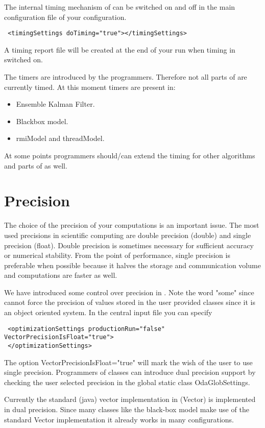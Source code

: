 The internal timing mechanism of \oda can be switched on and off in the main configuration file of your \oda configuration. 
{\footnotesize
\begin{verbatim}
 <timingSettings doTiming="true"></timingSettings>
\end{verbatim}}  
A timing report file will be created at the end of your run when timing in switched on.

The timers are introduced by the programmers. Therefore not all parts of \oda are currently timed. At this moment timers are present in:
\begin{itemize}
\item Ensemble Kalman Filter.
\item Blackbox model.
\item rmiModel and threadModel.
\end{itemize}

At some points programmers should/can extend the timing for other algorithms and parts of \oda as well.

\section{Precision}
The choice of the precision of your computations is an important issue. The most used precisions in scientific computing are double precision (double) and single precision (float). Double precision is sometimes necessary for sufficient accuracy or numerical stability. From the point of performance, single precision is preferable when possible because it halves the storage and communication volume and computations are faster as well.

We have introduced some control over precision in \oda. Note the word "some" since \oda cannot force the precision of values stored in the user provided classes since it is an object oriented system. In the central input file you can specify
{\footnotesize
\begin{verbatim}
 <optimizationSettings productionRun="false" VectorPrecisionIsFloat="true">
 </optimizationSettings>
\end{verbatim}}  
The option VectorPrecisionIsFloat="true" will mark the wish of the user to use single precision. Programmers of \oda classes can introduce dual precision support by checking the user selected precision in the global static class OdaGlobSettings.

Currently the standard (java) vector implementation in \oda (Vector) is implemented in dual precision. Since many classes like the black-box model make use of the standard Vector implementation it already works in many configurations. 

